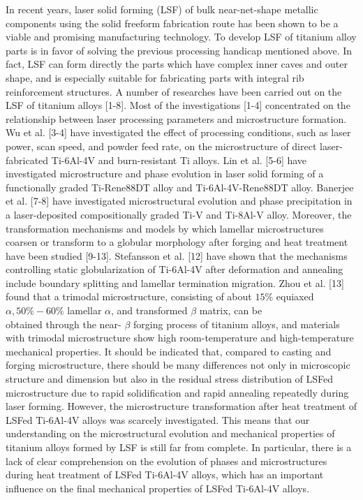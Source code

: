 \documentclass[10pt]{article}
\begin{document}
In recent years, laser solid forming (LSF) of bulk near-net-shape metallic components using the solid freeform fabrication route has been shown to be a viable and promising manufacturing technology. To develop LSF of titanium alloy parts is in favor of solving the previous processing handicap mentioned above. In fact, LSF can form directly the parts which have complex inner caves and outer shape, and is especially suitable for fabricating parts with integral rib reinforcement structures. A number of researches have been carried out on the LSF of titanium alloys [1-8]. Most of the investigations [1-4] concentrated on the relationship between laser processing parameters and microstructure formation. Wu et al. [3-4] have investigated the effect of processing conditions, such as laser power, scan speed, and powder feed rate, on the microstructure of direct laser-fabricated Ti-6Al-4V and burn-resistant Ti alloys. Lin et al. [5-6] have investigated microstructure and phase evolution in laser solid forming of a functionally graded Ti-Rene88DT alloy and Ti-6Al-4V-Rene88DT alloy. Banerjee et al. [7-8] have investigated microstructural evolution and phase precipitation in a laser-deposited compositionally graded Ti-V and Ti-8Al-V alloy. Moreover, the transformation mechanisms and models by which lamellar microstructures coarsen or transform to a globular morphology after forging and heat treatment have been studied [9-13]. Stefansson et al. [12] have shown that the mechanisms controlling static globularization of Ti-6Al-4V after deformation and annealing include boundary splitting and lamellar termination migration. Zhou et al. [13] found that a trimodal microstructure, consisting of about $15 \%$ equiaxed $\alpha, 50 \%-60 \%$ lamellar $\alpha$, and transformed $\beta$ matrix, can be\\
obtained through the near- $\beta$ forging process of titanium alloys, and materials with trimodal microstructure show high room-temperature and high-temperature mechanical properties. It should be indicated that, compared to casting and forging microstructure, there should be many differences not only in microscopic structure and dimension but also in the residual stress distribution of LSFed microstructure due to rapid solidification and rapid annealing repeatedly during laser forming. However, the microstructure transformation after heat treatment of LSFed Ti-6Al-4V alloys was scarcely investigated. This means that our understanding on the microstructural evolution and mechanical properties of titanium alloys formed by LSF is still far from complete. In particular, there is a lack of clear comprehension on the evolution of phases and microstructures during heat treatment of LSFed Ti-6Al-4V alloys, which has an important influence on the final mechanical properties of LSFed Ti-6Al-4V alloys.
\end{document}
